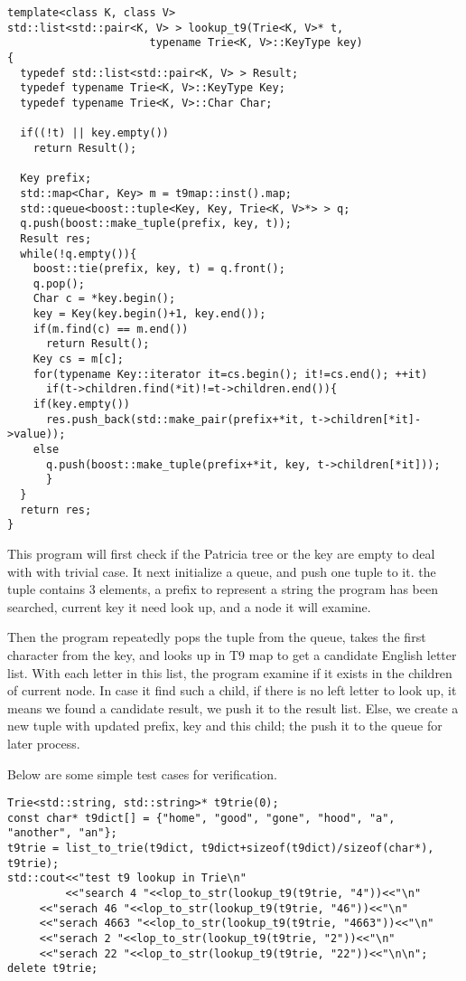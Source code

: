 \documentclass{article}
\begin{document}
\begin{lstlisting}
template<class K, class V>
std::list<std::pair<K, V> > lookup_t9(Trie<K, V>* t,
				      typename Trie<K, V>::KeyType key)
{
  typedef std::list<std::pair<K, V> > Result;
  typedef typename Trie<K, V>::KeyType Key;
  typedef typename Trie<K, V>::Char Char;

  if((!t) || key.empty())
    return Result();
  
  Key prefix;
  std::map<Char, Key> m = t9map::inst().map;
  std::queue<boost::tuple<Key, Key, Trie<K, V>*> > q;
  q.push(boost::make_tuple(prefix, key, t));
  Result res;
  while(!q.empty()){
    boost::tie(prefix, key, t) = q.front();
    q.pop();
    Char c = *key.begin();
    key = Key(key.begin()+1, key.end());
    if(m.find(c) == m.end())
      return Result();
    Key cs = m[c];
    for(typename Key::iterator it=cs.begin(); it!=cs.end(); ++it)
      if(t->children.find(*it)!=t->children.end()){
	if(key.empty())
	  res.push_back(std::make_pair(prefix+*it, t->children[*it]->value));
	else
	  q.push(boost::make_tuple(prefix+*it, key, t->children[*it]));
      }
  }
  return res;
}
\end{lstlisting}

This program will first check if the Patricia tree or the key are
empty to deal with with trivial case. It next initialize a queue, and
push one tuple to it. the tuple contains 3 elements, a prefix to
represent a string the program has been searched, current key it need
look up, and a node it will examine. 

Then the program repeatedly pops the tuple from the queue, takes the
first character from the key, and looks up in T9 map to get a
candidate English letter list. With each letter in this list, the
program examine if it exists in the children of current node. In case
it find such a child, if there is no left letter to look up, it means
we found a candidate result, we push it to the result list. Else, we
create a new tuple with updated prefix, key and this child; the push
it to the queue for later process.

Below are some simple test cases for verification.

\begin{lstlisting}
Trie<std::string, std::string>* t9trie(0);
const char* t9dict[] = {"home", "good", "gone", "hood", "a", "another", "an"};
t9trie = list_to_trie(t9dict, t9dict+sizeof(t9dict)/sizeof(char*), t9trie);
std::cout<<"test t9 lookup in Trie\n"
         <<"search 4 "<<lop_to_str(lookup_t9(t9trie, "4"))<<"\n"
	 <<"serach 46 "<<lop_to_str(lookup_t9(t9trie, "46"))<<"\n"
	 <<"serach 4663 "<<lop_to_str(lookup_t9(t9trie, "4663"))<<"\n"
	 <<"serach 2 "<<lop_to_str(lookup_t9(t9trie, "2"))<<"\n"
	 <<"serach 22 "<<lop_to_str(lookup_t9(t9trie, "22"))<<"\n\n";
delete t9trie;
\end{lstlisting}
\end{document}
